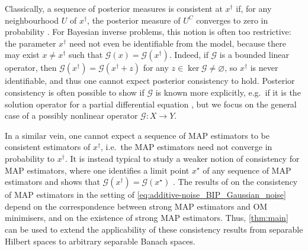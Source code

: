 \documentclass[11pt]{article}
\renewcommand*{\emptyset}{\varnothing}
\theoremstyle{plain}
\theoremstyle{definition}
\numberwithin{equation}{section}
\numberwithin{figure}{section}
\numberwithin{table}{section}
\begin{document}
Classically, a sequence of posterior measures is consistent at $x^{\dagger}$ if, for any neighbourhood $U$ of $x^{\dagger}$, the posterior measure of $U^{C}$ converges to zero in probability \citep{GhosalVanDerVaart2017}.
For Bayesian inverse problems, this notion is often too restrictive:
the parameter $x^{\dagger}$ need not even be identifiable from the model, because there may exist $x \neq x^{\dagger}$ such that $\mathcal{G}(x) = \mathcal{G}(x^{\dagger})$.
Indeed, if $\mathcal{G}$ is a bounded linear operator, then $\mathcal{G}(x^{\dagger}) = \mathcal{G}(x^{\dagger} + z)$ for any $z \in \ker \mathcal{G} \neq \emptyset$, so $x^{\dagger}$ is never identifiable, and thus one cannot expect posterior consistency to hold.
Posterior consistency is often possible to show if $\mathcal{G}$ is known more explicitly, e.g.\ if it is the solution operator for a partial differential equation \citep[see][]{KnapikVanDerVaartVanZanten2011, AgapiouLarssonStuart2013, Vollmer2013}, but we focus on the general case of a possibly nonlinear operator $\mathcal{G} \colon X \to Y$.

In a similar vein, one cannot expect a sequence of MAP estimators to be consistent estimators of $x^{\dagger}$, i.e.\ the MAP estimators need not converge in probability to $x^{\dagger}$.
It is instead typical to study a weaker notion of consistency for MAP estimators, where one identifies a limit point $x^{\star}$ of any sequence of MAP estimators and shows that $\mathcal{G}(x^{\dagger}) = \mathcal{G}(x^{\star})$ \citep{DashtiLawStuartVoss2013,Dunlop2019,AgapiouBurgerDashtiHelin2018}.
The results of \citet[Section~4]{DashtiLawStuartVoss2013} on the consistency of MAP estimators in the setting of \eqref{eq:additive-noise_BIP_Gaussian_noise} depend on the correspondence between strong MAP estimators and OM minimisers, and on the existence of strong MAP estimators.
Thus, \cref{thm:main} can be used to extend the applicability of these consistency results from separable Hilbert spaces to arbitrary separable Banach spaces.
\end{document}
